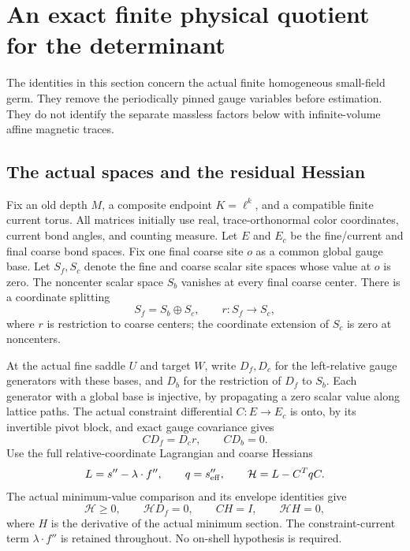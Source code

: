 \section{An exact finite physical quotient for the determinant}
\label{pqd-section}

The identities in this section concern the actual finite homogeneous
small-field germ. They remove the periodically pinned gauge variables
before estimation. They do not identify the separate massless factors
below with infinite-volume affine magnetic traces.

\subsection{The actual spaces and the residual Hessian}
\label{pqd-spaces}

Fix an old depth $M$, a composite endpoint $K=\ell^k$, and a compatible
finite current torus. All matrices initially use real, trace-orthonormal
color coordinates, current bond angles, and counting measure. Let $E$
and $E_c$ be the fine/current and final coarse bond spaces. Fix one final
coarse site $o$ as a common global gauge base. Let $S_f,S_c$ denote the
fine and coarse scalar site spaces whose value at $o$ is zero. The
noncenter scalar space $S_b$ vanishes at every final coarse center.
There is a coordinate splitting
\begin{equation}
 S_f=S_b\oplus S_c,\qquad r:S_f\longrightarrow S_c,
 \label{pqd-scalar-split}
\end{equation}
where $r$ is restriction to coarse centers; the coordinate extension of
$S_c$ is zero at noncenters.

At the actual fine saddle $U$ and target $W$, write $D_f,D_c$ for the
left-relative gauge generators with these bases, and $D_b$ for the
restriction of $D_f$ to $S_b$. Each generator with a global base is
injective, by propagating a zero scalar value along lattice paths.
The actual constraint differential $C:E\to E_c$ is onto, by its
invertible pivot block, and exact gauge covariance gives
\begin{equation}
 CD_f=D_c r,\qquad CD_b=0.\label{pqd-covariance}
\end{equation}
Use the full relative-coordinate Lagrangian and coarse Hessians
\begin{equation}
 L=s''-\lambda\cdot f'',\qquad q=s_{\rm eff}'',\qquad
 \mathcal H=L-C^TqC.\label{pqd-residual}
\end{equation}
The actual minimum-value comparison and its envelope identities give
\begin{equation}
 \mathcal H\ge0,\qquad \mathcal H D_f=0,\qquad
 CH=I,\qquad \mathcal H H=0,\label{pqd-residual-identities}
\end{equation}
where $H$ is the derivative of the actual minimum section.
The constraint-current term $\lambda\cdot f''$ is retained throughout.
No on-shell hypothesis is required.

